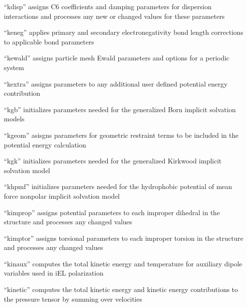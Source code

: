 \documentclass[letterpaper,11pt,english]{sphinxmanual}
\begin{document}

“kdisp” assigns C6 coefficients and damping parameters for
dispersion interactions and processes any new or changed
values for these parameters


“keneg” applies primary and secondary electronegativity bond
length corrections to applicable bond parameters


“kewald” assigns particle mesh Ewald parameters and options
for a periodic system


“kextra” assigns parameters to any additional user defined
potential energy contribution


“kgb” initializes parameters needed for the generalized
Born implicit solvation models


“kgeom” asisgns parameters for geometric restraint terms
to be included in the potential energy calculation


“kgk” initializes parameters needed for the generalized
Kirkwood implicit solvation model


“khpmf” initializes parameters needed for the hydrophobic
potential of mean force nonpolar implicit solvation model


“kimprop” assigns potential parameters to each improper
dihedral in the structure and processes any changed values


“kimptor” assigns torsional parameters to each improper
torsion in the structure and processes any changed values


“kinaux” computes the total kinetic energy and temperature
for auxiliary dipole variables used in iEL polarization


“kinetic” computes the total kinetic energy and kinetic energy
contributions to the pressure tensor by summing over velocities
\end{document}
